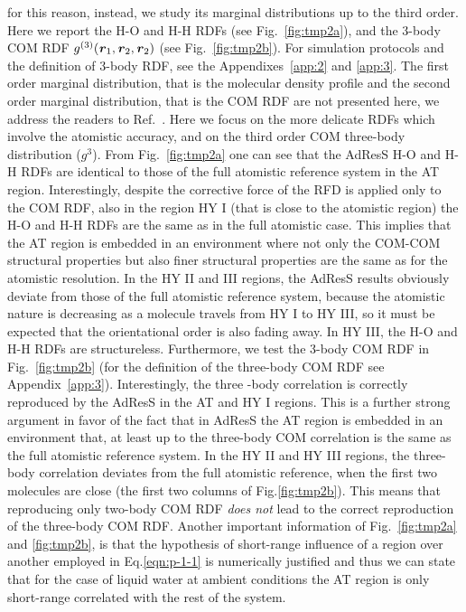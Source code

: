 \documentclass[aps,a4paper,reprint,onecolumn]{revtex4}
\newcommand{\vect}[1]{\textbf{\textit{#1}}}
\begin{document}
for this reason, instead, we study its marginal distributions up to the third order.
Here we report the H-O and H-H RDFs (see Fig.~\ref{fig:tmp2a}), and the 3-body COM
RDF $g^{(3)}(\vect r_1, \vect r_2, \vect r_2)$ (see Fig.~\ref{fig:tmp2b}). For simulation
protocols and the definition of 3-body RDF, see the Appendixes~\ref{app:2} and \ref{app:3}.
The first order marginal distribution, that is the molecular density profile and the second order marginal distribution, that is the COM RDF are not presented here, we address the readers to Ref.~\cite{rdfcorr}. 
Here we focus on the more delicate RDFs which involve the atomistic accuracy, and on the third order COM three-body distribution ($g^{3}$). From Fig.~\ref{fig:tmp2a} one can see that
the AdResS H-O and H-H RDFs are identical to those of 
the full atomistic reference system in the AT region.
Interestingly, despite the corrective force of the RFD is applied only to the COM RDF, also in the region HY I (that is close to the atomistic region) the H-O and H-H RDFs are the same as in the full atomistic case.
This implies that the AT region
is embedded in an environment where not only the COM-COM structural properties but also finer structural
properties are the same as for the atomistic resolution.
In the HY II and III regions, the AdResS results obviously deviate from those
of the full atomistic reference system, because the atomistic nature 
is decreasing as a molecule travels from HY I to HY III, so it must be expected 
that the orientational order is also fading away. In HY III, the H-O and H-H
RDFs are structureless.
Furthermore, we test the 3-body COM RDF in Fig.~\ref{fig:tmp2b} (for the definition of the three-body COM RDF see Appendix~\ref{app:3}).
Interestingly, the three -body correlation is correctly reproduced
by the AdResS in the AT and HY I  regions. This is a further strong argument in favor of the fact that in AdResS the AT region is embedded in an environment that, at least up to the three-body COM correlation is the same as the full atomistic reference system.
In the HY II and HY III regions, the three-body correlation deviates from the
full atomistic reference, when the first two molecules are close (the first
two columns of Fig.\ref{fig:tmp2b}). This means that reproducing only two-body COM RDF \emph{does not}
lead to the correct reproduction of the three-body COM RDF.
Another important information of Fig.~\ref{fig:tmp2a} and \ref{fig:tmp2b},
is that the hypothesis of short-range influence of a region over another employed in Eq.\ref{eqn:p-1-1} is numerically justified and thus we can state that for the case of liquid water at ambient conditions the AT region is only short-range
correlated with the rest of the system.
\end{document}

